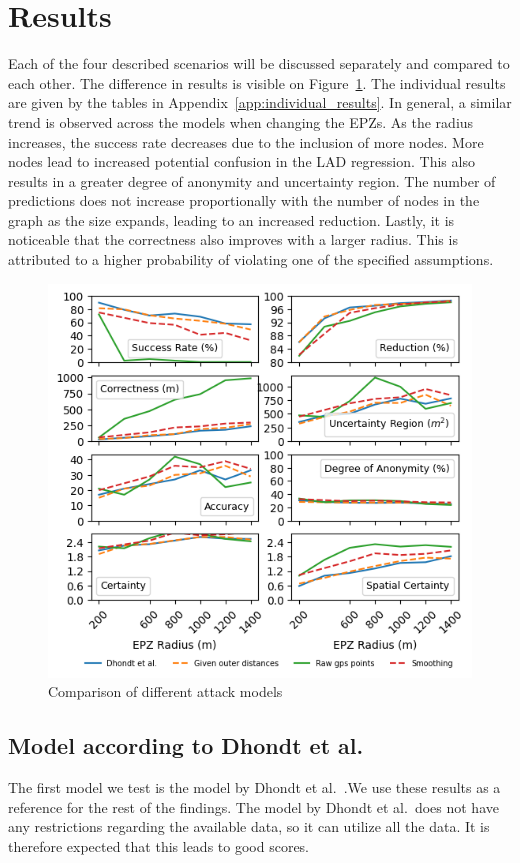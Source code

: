 \documentclass[conference]{IEEEtran}
\begin{document}
\section{\textbf{Results}}

Each of the four described scenarios will be discussed separately and compared
to each other. The difference in results is visible on
Figure~\ref{fig:attack_comparison}. The individual results are given by the
tables in Appendix~\ref{app:individual_results}. In general, a similar trend is
observed across the models when changing the EPZs. As the radius increases, the
success rate decreases due to the inclusion of more nodes. More nodes lead to
increased potential confusion in the LAD regression. This also results in a
greater degree of anonymity and uncertainty region. The number of predictions
does not increase proportionally with the number of nodes in the graph as the
size expands, leading to an increased reduction. Lastly, it is noticeable that
the correctness also improves with a larger radius. This is attributed to a
higher probability of violating one of the specified assumptions.
\begin{figure}[h]
    \centering
    \includegraphics[width=\linewidth]{fig/result_graphs/all_results.png}
    \caption{Comparison of different attack models}\label{fig:attack_comparison}
\end{figure}

\subsection{Model according to Dhondt et al.}
The first model we test is the model by Dhondt et al.~\cite{Dhondt}.We use
these results as a reference for the rest of the findings. The model by Dhondt
et al.\ does not have any restrictions regarding the available data, so it can
utilize all the data. It is therefore expected that this leads to good scores.
\end{document}
